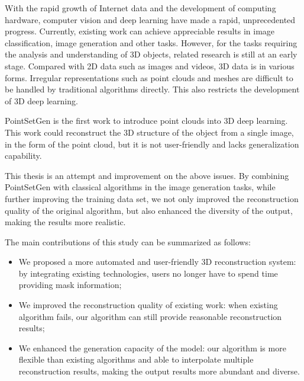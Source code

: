 
\begin{eabstract}

	With the rapid growth of Internet data and the development of computing hardware, computer vision and deep learning have made a rapid, unprecedented progress.
	Currently, existing work %
	can achieve appreciable results in image classification, image generation and other tasks.
	However, for the tasks requiring the analysis and understanding of 3D objects, related research is still at an early stage.
	Compared with 2D data such as images and videos, 3D data is in various forms.
	Irregular representations such as point clouds and meshes are difficult to be handled by traditional algorithms directly. This also restricts the development of 3D deep learning.

	PointSetGen\cite{pointsetgen} is the first work to introduce point clouds into 3D deep learning.
	This work could reconstruct the 3D structure of the object from a single image, in the form of the point cloud,
	but it is not user-friendly and lacks generalization capability.


	This thesis is an attempt and improvement on the above issues.
	By combining PointSetGen with classical algorithms in the image generation tasks, while further improving the training data set, we not only improved the reconstruction quality of the original algorithm, but also enhanced the diversity of the output, making the results more realistic.%

	The main contributions of this study can be summarized as follows:
	\begin{itemize}
		\item We proposed a more automated and user-friendly 3D reconstruction system:
		      by integrating existing technologies, users no longer have to spend time providing mask information;
		\item We improved the reconstruction quality of existing work:
		      when existing algorithm fails, our algorithm can still provide reasonable reconstruction
		      results;
		\item We enhanced the generation capacity of the model:
		      our algorithm is more flexible than existing algorithms and able to interpolate multiple reconstruction results, making the output results more abundant and diverse.
	\end{itemize}


\end{eabstract}


